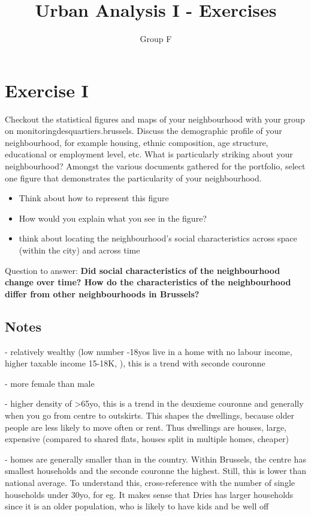 \documentclass{article}
\title{Urban Analysis I - Exercises}
\author{Group F}
\begin{document}
\maketitle

\tableofcontents

\section{Exercise I}

Checkout the statistical figures and maps of your neighbourhood with your group on monitoringdesquartiers.brussels. Discuss the demographic profile of your neighbourhood, for example housing, ethnic composition, age structure, educational or employment level, etc. What is particularly striking about your neighbourhood? Amongst the various documents gathered for the portfolio, select one figure that demonstrates the particularity of your neighbourhood. 

\begin{itemize}
	\item Think about how to represent this figure
	\item How would you explain what you see in the figure?
	\item think about locating the neighbourhood's social characteristics across space (within the city) and across time
\end{itemize}

Question to answer: \textbf{Did social characteristics of the neighbourhood change over time? How do the characteristics of the neighbourhood differ from other neighbourhoods in Brussels?}

\subsection{Notes}

- relatively wealthy (low number -18yos live in a home with no labour income, higher taxable income 15-18K, ), this is a trend with seconde couronne

- more female than male

- higher density of >65yo, this is a trend in the deuxieme couronne and generally when you go from centre to outskirts. This shapes the dwellings, because older people are less likely to move often or rent. Thus dwellings are houses, large, expensive (compared to shared flats, houses split in multiple homes, cheaper)

- homes are generally smaller than in the country. Within Brussels, the centre has smallest households and the seconde couronne the highest. Still, this is lower than national average. To understand this, cross-reference with the number of single households under 30yo, for eg. It makes sense that Dries has larger households since it is an older population, who is likely to have kids and be well off
\end{document}
